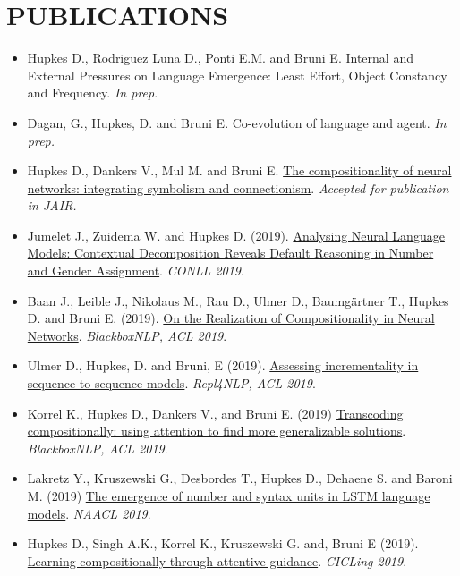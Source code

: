 \section{PUBLICATIONS}

\begin{itemize}
\setlength\itemsep{5pt}
    \item Hupkes D., Rodriguez Luna D., Ponti E.M. and Bruni E. Internal and External Pressures on Language Emergence:
Least Effort, Object Constancy and Frequency. \textit{In prep}.
    \item Dagan, G., Hupkes, D. and Bruni E. Co-evolution of language and agent. \textit{In prep.}
    \item Hupkes D., Dankers V., Mul M. and Bruni E. \href{https://arxiv.org/pdf/1908.08351.pdf}{The compositionality of neural networks: integrating symbolism and connectionism}. \textit{Accepted for publication in JAIR.}
    
    \item Jumelet J., Zuidema W. and Hupkes D. (2019). \href{https://arxiv.org/pdf/1909.08975.pdf}{Analysing Neural Language Models: Contextual Decomposition Reveals Default Reasoning in Number and Gender Assignment}. \textit{CONLL 2019}.
    
    \item Baan J., Leible J., Nikolaus M., Rau D., Ulmer D., Baumgärtner T., Hupkes D. and Bruni E. (2019). \href{https://www.aclweb.org/anthology/W19-4814}{On the Realization of Compositionality in Neural Networks}. \textit{BlackboxNLP, ACL 2019}. 
    
    \item Ulmer D., Hupkes, D. and Bruni, E (2019). \href{https://www.aclweb.org/anthology/W19-4324}{Assessing incrementality in sequence-to-sequence models}. \textit{Repl4NLP, ACL 2019}. 
    
    \item Korrel K., Hupkes D., Dankers V., and Bruni E. (2019) \href{https://www.aclweb.org/anthology/W19-4801}{Transcoding compositionally: using attention to find more generalizable solutions}. \textit{BlackboxNLP, ACL 2019}.
    
    \item Lakretz Y., Kruszewski G., Desbordes T., Hupkes D., Dehaene S. and Baroni M. (2019) \href{https://www.aclweb.org/anthology/N19-1002}{The emergence of number and syntax units in LSTM language models}. \textit{NAACL 2019}.

    \item  Hupkes D., Singh A.K., Korrel K., Kruszewski G. and, Bruni E (2019). \href{https://arxiv.org/abs/1805.09657}{Learning compositionally through attentive guidance}. \textit{CICLing 2019}.
    

\end{itemize}
